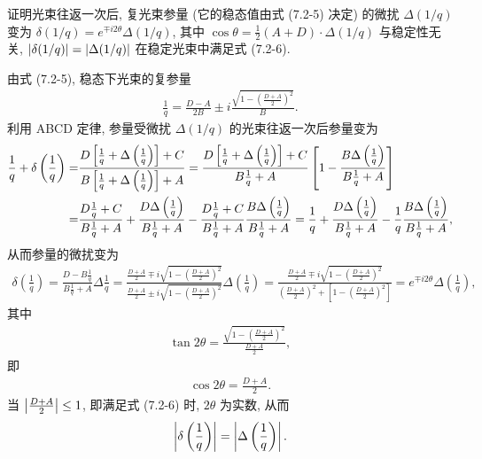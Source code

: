 \documentclass[twoside]{note}
\begin{document}
\begin{exe}
    证明光束往返一次后, 复光束参量 (它的稳态值由式 (7.2-5) 决定) 的微扰 $\Delta(1/q)$ 变为 $\delta(1/q)=e^{\mp i2\theta}\Delta(1/q)$, 其中 $\cos\theta=\frac{1}{2}(A+D)\cdot\Delta(1/q)$ 与稳定性无关, $\left\lvert\delta(1/q)\right\rvert=\left\lvert\Delta(1/q)\right\rvert$ 在稳定光束中满足式 (7.2-6).
\end{exe}
\begin{pf}
    由式 (7.2-5), 稳态下光束的复参量
    \begin{align}
        \frac{1}{q}=\frac{D-A}{2B}\pm i\frac{\sqrt{1-\left(\frac{D+A}{2}\right)^2}}{B}.
    \end{align}
    利用 ABCD 定律, 参量受微扰 $\Delta(1/q)$ 的光束往返一次后参量变为
    \begin{align}
        \notag\frac{1}{q}+\delta\left(\frac{1}{q}\right)=&\frac{D\left[\frac{1}{q}+\Delta\left(\frac{1}{q}\right)\right]+C}{B\left[\frac{1}{q}+\Delta\left(\frac{1}{q}\right)\right]+A}=\frac{D\left[\frac{1}{q}+\Delta\left(\frac{1}{q}\right)\right]+C}{B\frac{1}{q}+A}\left[1-\frac{B\Delta\left(\frac{1}{q}\right)}{B\frac{1}{q}+A}\right]\\
        =&\frac{D\frac{1}{q}+C}{B\frac{1}{q}+A}+\frac{D\Delta\left(\frac{1}{q}\right)}{B\frac{1}{q}+A}-\frac{D\frac{1}{q}+C}{B\frac{1}{q}+A}\frac{B\Delta\left(\frac{1}{q}\right)}{B\frac{1}{q}+A}=\frac{1}{q}+\frac{D\Delta\left(\frac{1}{q}\right)}{B\frac{1}{q}+A}-\frac{1}{q}\frac{B\Delta\left(\frac{1}{q}\right)}{B\frac{1}{q}+A},
    \end{align}
    从而参量的微扰变为
    \begin{align}
        \delta\left(\frac{1}{q}\right)=\frac{D-B\frac{1}{q}}{B\frac{1}{q}+A}\Delta\frac{1}{q}=\frac{\frac{D+A}{2}\mp i\sqrt{1-\left(\frac{D+A}{2}\right)^2}}{\frac{D+A}{2}\pm i\sqrt{1-\left(\frac{D+A}{2}\right)^2}}\Delta\left(\frac{1}{q}\right)=\frac{\frac{D+A}{2}\mp i\sqrt{1-\left(\frac{D+A}{2}\right)^2}}{\left(\frac{D+A}{2}\right)^2+\left[1-\left(\frac{D+A}{2}\right)^2\right]}=e^{\mp i2\theta}\Delta\left(\frac{1}{q}\right),
    \end{align}
    其中
    \begin{align}
        \tan 2\theta=\frac{\sqrt{1-\left(\frac{D+A}{2}\right)^2}}{\frac{D+A}{2}},
    \end{align}
    即
    \begin{align}
        \cos 2\theta=\frac{D+A}{2}.
    \end{align}
    当 $\left\lvert\frac{D+A}{2}\right\rvert\leq 1$, 即满足式 (7.2-6) 时, $2\theta$ 为实数, 从而
    \begin{align}
        \left\lvert\delta\left(\frac{1}{q}\right)\right\rvert=\left\lvert\Delta\left(\frac{1}{q}\right)\right\rvert.
    \end{align}
\end{pf}
\ifx\allfiles\undefined
\end{document}
